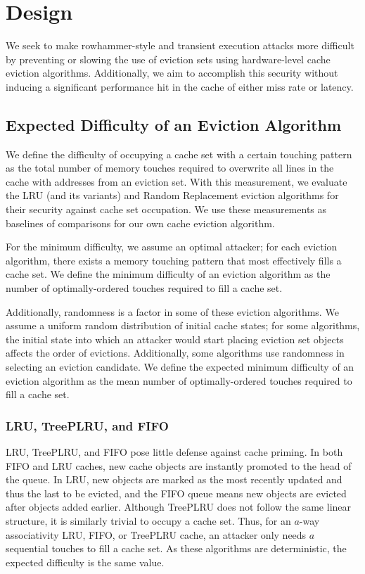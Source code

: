 \documentclass[letterpaper, twocolumn]{article}
\begin{document}
\section{Design}

We seek to make rowhammer-style and transient execution attacks more difficult by preventing or slowing the use of eviction sets
using hardware-level cache eviction algorithms.
Additionally, we aim to accomplish this security without inducing a significant performance hit in the cache of either miss rate or latency.

\subsection{Expected Difficulty of an Eviction Algorithm}
We define the difficulty of occupying a cache set with a certain touching pattern as the total number of memory touches
required to overwrite all lines in the cache with addresses from an eviction set.
With this measurement, we evaluate the LRU (and its variants) and Random Replacement eviction algorithms for their security against cache set occupation.
We use these measurements as baselines of comparisons for our own cache eviction algorithm.

For the minimum difficulty, we assume an optimal attacker;
for each eviction algorithm, there exists a memory touching pattern that most effectively fills a cache set.
We define the minimum difficulty of an eviction algorithm as the number of optimally-ordered touches required to fill a cache set.

Additionally, randomness is a factor in some of these eviction algorithms.
We assume a uniform random distribution of initial cache states;
for some algorithms, the initial state into which an attacker would start placing eviction set objects affects the order of evictions.
Additionally, some algorithms use randomness in selecting an eviction candidate.
We define the expected minimum difficulty of an eviction algorithm as the mean number of optimally-ordered touches required to fill a cache set.

\subsubsection{LRU, TreePLRU, and FIFO}
LRU, TreePLRU, and FIFO pose little defense against cache priming.
In both FIFO and LRU caches, new cache objects are instantly promoted to the head of the queue.
In LRU, new objects are marked as the most recently updated and thus the last to be evicted,
and the FIFO queue means new objects are evicted after objects added earlier.
Although TreePLRU does not follow the same linear structure,
it is similarly trivial to occupy a cache set.
Thus, for an $a$-way associativity LRU, FIFO, or TreePLRU cache, an attacker only needs
$a$ sequential touches to fill a cache set.
As these algorithms are deterministic, the expected difficulty is the same value.
\end{document}
